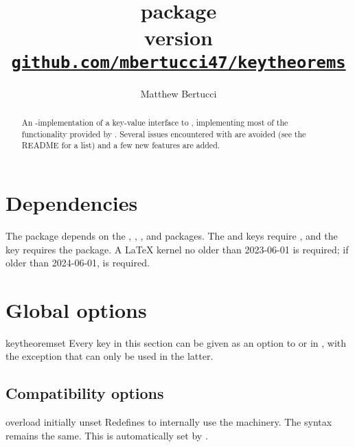 \documentclass{ltxdoc}
\title{%
  \pkg{keytheorems} package \\[1ex]
  \large version \keythmsversion \\[1ex]
  \href{https://github.com/mbertucci47/keytheorems}
    {\texttt{github.com/mbertucci47/keytheorems}}
  }
\author{Matthew Bertucci}
\begin{document}
\maketitle

\begin{abstract}
An -implementation of a key-value interface to , implementing most of the functionality provided by .
Several issues encountered with  are avoided (see the README for a list) and a few new features are added.
\end{abstract}

\tableofcontents

\section{Dependencies}

The package depends on the , , , and  packages.
The  and  keys require , and the  key requires the  package.
A \LaTeX{} kernel no older than 2023-06-01 is required; if older than 2024-06-01,  is required.
    
\section{Global options}

\begin{docCommand}{keytheoremset}
  {}
Every key in this section can be given as an option to  or in , with the exception that  can only be used in the latter.
\end{docCommand}

\subsection{Compatibility options}

\begin{docKey}{overload}
  {}
  {initially unset}
Redefines  to internally use the  machinery. The syntax remains the same.
This is automatically set by .
\end{docKey}
\end{document}
